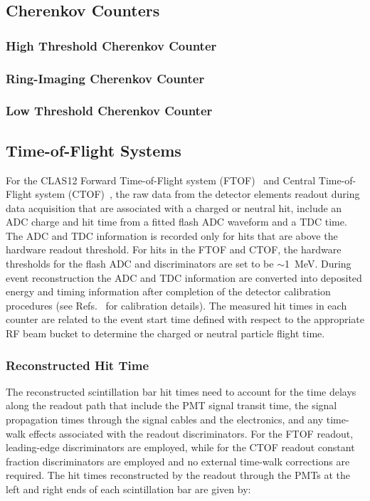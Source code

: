 \documentclass{elsart}
\begin{document}
\subsection{Cherenkov Counters}

\subsubsection{High Threshold Cherenkov Counter}

\subsubsection{Ring-Imaging Cherenkov Counter}

\subsubsection{Low Threshold Cherenkov Counter}

\subsection{Time-of-Flight Systems}

For the CLAS12 Forward Time-of-Flight system (FTOF)~\cite{ftof-nim} and Central Time-of-Flight system
(CTOF)~\cite{ctof-nim}, the raw data from the detector elements readout during data acquisition that are
associated with a charged or neutral hit, include an ADC charge and hit time from a fitted flash ADC waveform
and a TDC time. The ADC and TDC information is recorded only for hits that are above the hardware readout
threshold. For hits in the FTOF and CTOF, the hardware thresholds for the flash ADC and discriminators are set
to be $\sim$1~MeV. During event reconstruction the ADC and TDC information are converted into deposited energy
and timing information after completion of the detector calibration procedures (see Refs.~\cite{ftof-nim,ctof-nim}
for calibration details). The measured hit times in each counter are related to the event start time defined with
respect to the appropriate RF beam bucket to determine the charged or neutral particle flight time.

\subsubsection{Reconstructed Hit Time}
\label{rec:time}

The reconstructed scintillation bar hit times need to account for the time delays along the readout path that
include the PMT signal transit time, the signal propagation times through the signal cables and the electronics, 
and any time-walk effects associated with the readout discriminators. For the FTOF readout, leading-edge
discriminators are employed, while for the CTOF readout constant fraction discriminators are employed and no
external time-walk corrections are required. The hit times reconstructed by the readout through the PMTs at
the left and right ends of each scintillation bar are given by:
\end{document}

